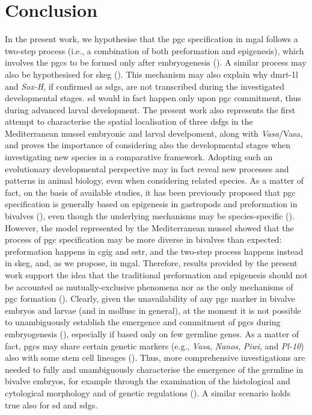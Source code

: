 \section{Conclusion}\label{chapter:insitu-conclusions}
In the present work, we hypothesise that the \gls{pgc} specification in \gls{mgal} follows a two-step process (i.e., a combination of both preformation and epigenesis), which involves the \glspl{pgc} to be formed only after embryogenesis (). A similar process may also be hypothesised for \gls{skeg} (). This mechanism may also explain why \gls{dmrt-1l} and \textit{Sox-H}, if confirmed as \glspl{sdg}, are not transcribed during the investigated developmental stages. \gls{sd} would in fact happen only upon \gls{pgc} commitment, thus during advanced larval development. The present work also represents the first attempt to characterise the spatial localisation of three \glspl{dsfg} in the Mediterranean mussel embryonic and larval develpoment, along with \textit{Vasa}/Vasa, and proves the importance of considering also the developmental stages when investigating new species in a comparative framework. Adopting such an evolutionary developmental perspective may in fact reveal new processes and patterns in animal biology, even when considering related species. As a matter of fact, on the basis of available studies, it has been previously proposed that \gls{pgc} specification is generally based on epigenesis in gastropods and preformation in bivalves (), even though the underlying mechanisms may be species-specific (). However, the model represented by the Mediterranean mussel showed that the process of \gls{pgc} specification may be more diverse in bivalves than expected: preformation happens in \gls{cgig} and \gls{sstr}, and the two-step process happens instead in \gls{skeg}, and, as we propose, in \gls{mgal}. Therefore, results provided by the present work support the idea that the traditional preformation and epigenesis should not be accounted as mutually-exclusive phenomena nor as the only mechanisms of \gls{pgc} formation (). Clearly, given the unavailability of any \gls{pgc} marker in bivalve embryos and larvae (and in mollusc in general), at the moment it is not possible to unambiguously establish the emergence and commitment of \glspl{pgc} during embryogenesis (), especially if based only on few germline genes. As a matter of fact, \glspl{pgc} may share certain genetic markers (e.g., \textit{Vasa}, \textit{Nanos}, \textit{Piwi}, and \textit{Pl-10}) also with some stem cell lineages (). Thus, more comprehensive investigations are needed to fully and unambiguously characterise the emergence of the germline in bivalve embryos, for example through the examination of the histological and cytological morphology and of genetic regulations (). A similar scenario holds true also for \gls{sd} and \glspl{sdg}. 